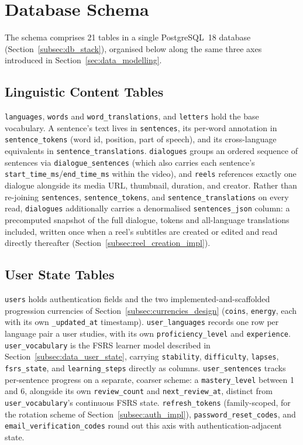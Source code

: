 \section{Database Schema}
\label{sec:db_schema}
    The schema comprises 21 tables in a single PostgreSQL~18 database (Section~\ref{subsec:db_stack}), organised below along the same three axes introduced in Section~\ref{sec:data_modelling}.

    \subsection{Linguistic Content Tables}
    \label{subsec:schema_linguistic}
    \texttt{languages}, \texttt{words} and \texttt{word\_translations}, and \texttt{letters} hold the base vocabulary. A sentence's text lives in \texttt{sentences}, its per-word annotation in \texttt{sentence\_tokens} (word id, position, part of speech), and its cross-language equivalents in \texttt{sentence\_translations}. \texttt{dialogues} groups an ordered sequence of sentences via \texttt{dialogue\_sentences} (which also carries each sentence's \texttt{start\_time\_ms}/\texttt{end\_time\_ms} within the video), and \texttt{reels} references exactly one dialogue alongside its media URL, thumbnail, duration, and creator. Rather than re-joining \texttt{sentences}, \texttt{sentence\_tokens}, and \texttt{sentence\_translations} on every read, \texttt{dialogues} additionally carries a denormalised \texttt{sentences\_json} column: a precomputed snapshot of the full dialogue, tokens and all-language translations included, written once when a reel's subtitles are created or edited and read directly thereafter (Section~\ref{subsec:reel_creation_impl}).

    \subsection{User State Tables}
    \label{subsec:schema_user_state}
    \begin{sloppypar}
    \texttt{users} holds authentication fields and the two implemented-and-scaffolded progression currencies of Section~\ref{subsec:currencies_design} (\texttt{coins}, \texttt{energy}, each with its own \texttt{\_updated\_at} timestamp). \texttt{user\_languages} records one row per language pair a user studies, with its own \texttt{proficiency\_level} and \texttt{experience}. \texttt{user\_vocabulary} is the FSRS learner model described in Section~\ref{subsec:data_user_state}, carrying \texttt{stability}, \texttt{difficulty}, \texttt{lapses}, \texttt{fsrs\_state}, and \texttt{learning\_steps} directly as columns. \texttt{user\_sentences} tracks per-sentence progress on a separate, coarser scheme: a \texttt{mastery\_level} between 1 and 6, alongside its own \texttt{review\_count} and \texttt{next\_review\_at}, distinct from \texttt{user\_vocabulary}'s continuous FSRS state. \texttt{refresh\_tokens} (family-scoped, for the rotation scheme of Section~\ref{subsec:auth_impl}), \texttt{password\_reset\_codes}, and \texttt{email\_verification\_codes} round out this axis with authentication-adjacent state.
    \end{sloppypar}

